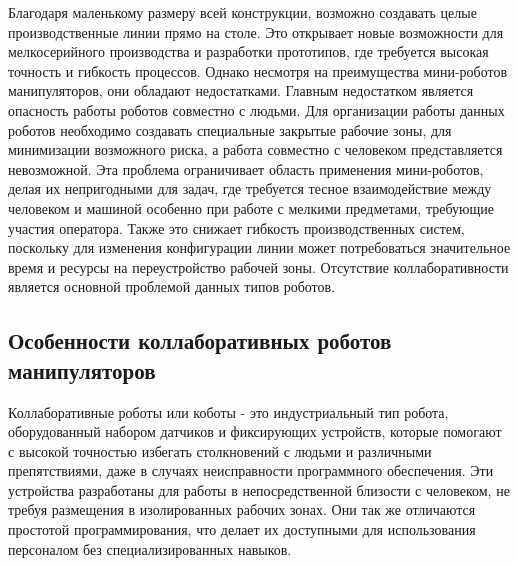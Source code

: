 Благодаря маленькому размеру всей конструкции, возможно создавать целые производственные линии прямо на столе. Это открывает новые возможности для мелкосерийного производства и разработки прототипов, где требуется высокая точность и гибкость процессов. Однако несмотря на преимущества мини-роботов манипуляторов, они обладают недостатками. Главным недостатком является опасность работы роботов совместно с людьми. Для организации работы данных роботов необходимо создавать специальные закрытые рабочие зоны, для минимизации возможного риска, а работа совместно с человеком представляется невозможной.
Эта проблема ограничивает область применения мини-роботов, делая их непригодными для задач, где требуется тесное взаимодействие между человеком и машиной особенно при работе с мелкими предметами, требующие участия оператора. Также это снижает гибкость производственных систем, поскольку для изменения конфигурации линии может потребоваться значительное время и ресурсы на переустройство рабочей зоны. Отсутствие коллаборативности является основной проблемой данных типов роботов.


\subsection{Особенности коллаборативных роботов манипуляторов}

Коллаборативные роботы или коботы - это индустриальный тип робота, оборудованный набором датчиков и фиксирующих устройств, которые помогают с высокой точностью избегать столкновений с людьми и различными препятствиями, даже в случаях неисправности программного обеспечения. Эти устройства разработаны для работы в непосредственной близости с человеком, не требуя размещения в изолированных рабочих зонах. Они так же отличаются простотой программирования, что делает их доступными для использования персоналом без специализированных навыков.


